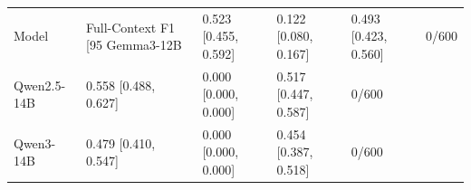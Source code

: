 \begin{tabular}{lllll}
\toprule
Model & Full-Context F1 [95%
\midrule
Gemma3-12B & 0.523 [0.455, 0.592] & 0.122 [0.080, 0.167] & 0.493 [0.423, 0.560] & 0/600 \\
Qwen2.5-14B & 0.558 [0.488, 0.627] & 0.000 [0.000, 0.000] & 0.517 [0.447, 0.587] & 0/600 \\
Qwen3-14B & 0.479 [0.410, 0.547] & 0.000 [0.000, 0.000] & 0.454 [0.387, 0.518] & 0/600 \\
\bottomrule
\end{tabular}
